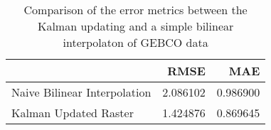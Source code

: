 \begin{table}[h!]
\caption{Comparison of the error metrics between the Kalman updating and a simple bilinear interpolaton of GEBCO data}
\label{raster_rmse_comparison}
\begin{tabular}{lrr}
\toprule
 & RMSE & MAE \\
\midrule
Naive Bilinear Interpolation & 2.086102 & 0.986900 \\
Kalman Updated Raster & 1.424876 & 0.869645 \\
\bottomrule
\end{tabular}
\end{table}
